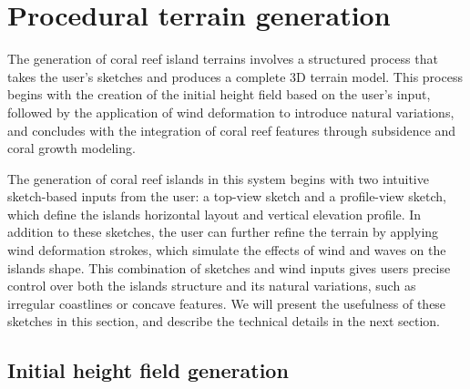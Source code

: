 \section{Procedural terrain generation}
\label{sec:coral-island_example-generation}


The generation of coral reef island terrains involves a structured process that takes the user's sketches and produces a complete 3D terrain model. This process begins with the creation of the initial height field based on the user's input, followed by the application of wind deformation to introduce natural variations, and concludes with the integration of coral reef features through subsidence and coral growth modeling.




The generation of coral reef islands in this system begins with two intuitive sketch-based inputs from the user: a top-view sketch and a profile-view sketch, which define the islands horizontal layout and vertical elevation profile. In addition to these sketches, the user can further refine the terrain by applying wind deformation strokes, which simulate the effects of wind and waves on the islands shape. This combination of sketches and wind inputs gives users precise control over both the islands structure and its natural variations, such as irregular coastlines or concave features. We will present the usefulness of these sketches in this section, and describe the technical details in the next section.



\subsection{Initial height field generation}
\label{sec:coral-island_generation-initial}



